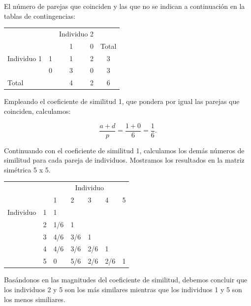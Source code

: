 \documentclass[spanish]{beamer}
\begin{document}
\begin{frame}
El número de parejas que coinciden y las que no se indican a continuación en la tablas de contingencias:
\begin{table}[h]
  \centering
  \label{tab:contingencias-ej}
\resizebox{6.5cm}{!} {
  \begin{tabular}{lrrrrr}
\multicolumn{2}{l}{\multirow{}{}{}} & \multicolumn{2}{c}{Individuo 2} & \\\cmidrule{3-4}
\multicolumn{2}{l}{}                  & 1        &   0       & \multicolumn{2}{c}{Total}                        \\ \midrule
Individuo 1      & 1      & 1        &  2       & \multicolumn{2}{c}{3}                     \\
                              & 0      & 3        &    0       & \multicolumn{2}{c}{3}                     \\ \midrule
\multicolumn{2}{l}{Total}            & 4     & 2     & \multicolumn{2}{c}{6}\\
\bottomrule
\end{tabular}
}
\end{table}
Empleando el coeficiente de similitud 1, que pondera por igual las parejas que coinciden, calculamos:

$$\frac{a+d}{p}=\frac{1+0}{6}=\frac{1}{6}. $$
\end{frame}

\begin{frame}{}
Continuando con el coeficiente de similitud 1, calculamos los demás números de similitud para cada pareja de individuos. Mostramos los resultados en la matriz simétrica 5 x 5.


\begin{table}[H]
\centering
\resizebox{7.5cm}{!} {
\begin{tabular}{lllllll}
\multicolumn{2}{l}{\multirow{}{}{}}               & \multicolumn{5}{c}{Individuo}                  \\
\multicolumn{2}{l}{}                                & 1   & 2   & 3   & 4   & 5                      \\ \cline{3-3} \cline{7-7} 
\multirow{}{}{Individuo} & \multicolumn{1}{l|}{1} & 1   &     &     &     & \multicolumn{1}{l|}{}  \\
                           & \multicolumn{1}{l|}{2} & 1/6 & 1   &     &     & \multicolumn{1}{l|}{}  \\
                           & \multicolumn{1}{l|}{3} & 4/6 & 3/6 & 1   &     & \multicolumn{1}{l|}{}  \\
                           & \multicolumn{1}{l|}{4} & 4/6 & 3/6 & 2/6 & 1   & \multicolumn{1}{l|}{}  \\
                           & \multicolumn{1}{l|}{5} & 0   & 5/6 & 2/6 & 2/6 & \multicolumn{1}{l|}{1} \\ \cline{3-3} \cline{7-7} 
\end{tabular}
}
\end{table}

Basándonos en las magnitudes del coeficiente de similitud, debemos concluir que los individuos 2 y 5 son los más similares mientras que los individuos 1 y 5 son los menos similiares.
\end{frame}
\end{document}
